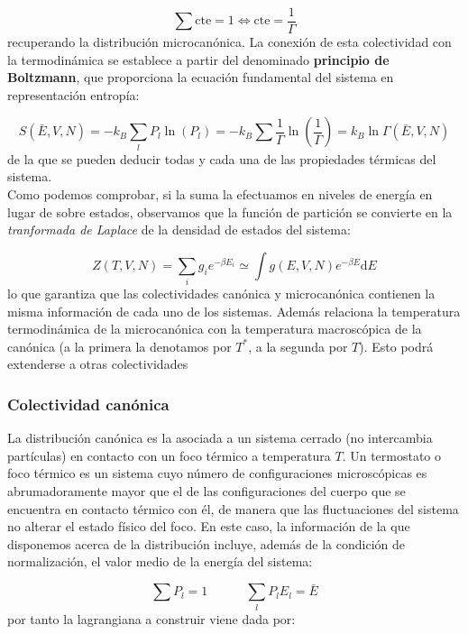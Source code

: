 \documentclass[12pt,a4paper]{article}
\numberwithin{equation}{section}
\numberwithin{figure}{section}
\newcommand{\tquad}{\quad \quad \quad}
\newcommand{\parentesis}[1]{\left( #1  \right)}
\newcommand{\D}{\mathrm{d}}
\newcommand{\cte}{\mathrm{cte}}
\theoremstyle{definition}
\begin{document}
\begin{equation}
\sum \cte  = 1 \Leftrightarrow \cte = \frac{1}{\Gamma}
\end{equation}
recuperando la distribución microcanónica. La conexión de esta colectividad con la termodinámica se establece a partir del denominado \textbf{principio de Boltzmann}, que proporciona la ecuación fundamental del sistema en representación entropía:

\begin{equation}
S (\bar{E},V,N) = - k_B \sum_l P_l \ln (P_l) = - k_B \sum \frac{1}{\Gamma} \ln \parentesis{\frac{1}{\Gamma}} = k_B \ln \Gamma (\bar{E},V,N)
\end{equation}
de la que se pueden deducir todas y cada una de las propiedades térmicas del sistema. \\

Como podemos comprobar, si la suma la efectuamos en niveles de energía en lugar de sobre estados, observamos que la función de partición se convierte en la \textit{tranformada de Laplace} de la densidad de estados del sistema:

\begin{equation}
Z(T,V,N) = \sum_i g_i e^{-\beta E_i} \simeq \int g(E,V,N) e^{-\beta E} \D E
\end{equation}
lo que garantiza que las colectividades canónica y microcanónica contienen la misma información de cada uno de los sistemas. Además relaciona la temperatura termodinámica de la microcanónica con la temperatura macroscópica de la canónica (a la primera la denotamos  por $T^*$, a la segunda por $T$). Esto podrá extenderse a otras colectividades

\subsubsection{Colectividad canónica}

La distribución canónica es la asociada a un sistema cerrado (no intercambia partículas) en contacto con un foco térmico a temperatura $T$. Un termostato o foco térmico es un sistema cuyo número de configuraciones microscópicas es abrumadoramente mayor que el de las configuraciones del cuerpo que se encuentra en contacto térmico con él, de manera que las fluctuaciones del sistema no alterar el estado físico del foco. En este caso, la información de la que disponemos acerca de la distribución incluye, además de la condición de normalización, el valor medio de la energía del sistema:

\begin{equation}
\sum P_l =1  \tquad \sum_l P_l E_l = \bar{E}
\end{equation}
por tanto la lagrangiana a construir viene dada por:
\end{document}
